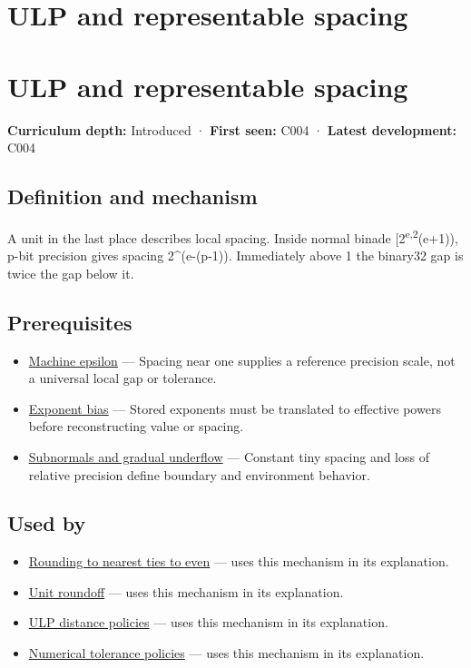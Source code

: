 \hypertarget{appendix-14bab4cab9d4}{}
\section*{ULP and representable spacing}
\section{ULP and representable spacing}\label{appendix-14bab4cab9d4-ulp-and-representable-spacing}

\textbf{Curriculum depth:} Introduced · \textbf{First seen:} C004 · \textbf{Latest development:} C004

\subsection{Definition and mechanism}\label{appendix-14bab4cab9d4-definition-and-mechanism}

A unit in the last place describes local spacing. Inside normal binade {[}2\textsuperscript{e,2}(e+1)), p-bit precision gives spacing 2\^{}(e-(p-1)). Immediately above 1 the binary32 gap is twice the gap below it.

\subsection{Prerequisites}\label{appendix-14bab4cab9d4-prerequisites}

\begin{itemize}
\tightlist
\item
  \hyperref[appendix-390ea641da54]{Machine epsilon} --- Spacing near one supplies a reference precision scale, not a universal local gap or tolerance.
\item
  \hyperref[appendix-2fae058c82e1]{Exponent bias} --- Stored exponents must be translated to effective powers before reconstructing value or spacing.
\item
  \hyperref[appendix-00a6e044c437]{Subnormals and gradual underflow} --- Constant tiny spacing and loss of relative precision define boundary and environment behavior.
\end{itemize}

\subsection{Used by}\label{appendix-14bab4cab9d4-used-by}

\begin{itemize}
\tightlist
\item
  \hyperref[appendix-614afe1de592]{Rounding to nearest ties to even} --- uses this mechanism in its explanation.
\item
  \hyperref[appendix-bc44f7b42f42]{Unit roundoff} --- uses this mechanism in its explanation.
\item
  \hyperref[appendix-deca299ae4b8]{ULP distance policies} --- uses this mechanism in its explanation.
\item
  \hyperref[appendix-0ec599f8ba27]{Numerical tolerance policies} --- uses this mechanism in its explanation.
\end{itemize}


